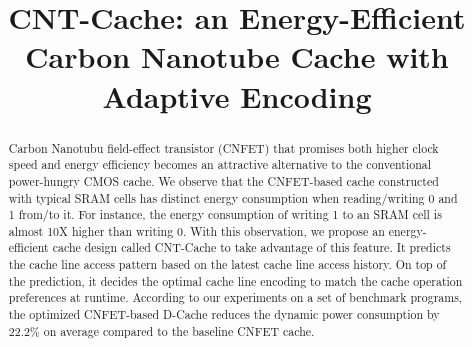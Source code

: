 \documentclass[conference]{IEEEtran}
\begin{document}
%
\title{CNT-Cache: an Energy-Efficient Carbon Nanotube Cache with Adaptive Encoding}

\maketitle

\begin{abstract}
    Carbon Nanotubu field-effect transistor (CNFET) that 
    promises both higher clock speed and energy efficiency 
    becomes an attractive alternative to the conventional 
    power-hungry CMOS cache. We observe that the CNFET-based cache 
    constructed with typical SRAM cells has distinct energy consumption 
    when reading/writing 0 and 1 from/to it. For instance, the energy consumption 
    of writing 1 to an SRAM cell is almost 10X higher than writing 0. 
    With this observation, we propose an energy-efficient cache design 
    called CNT-Cache to take advantage of this feature. It predicts the cache 
    line access pattern based on the latest cache line access history.  
    On top of the prediction, it decides the optimal cache line encoding 
    to match the cache operation preferences at runtime. According to 
    our experiments on a set of benchmark programs, the optimized CNFET-based 
    D-Cache reduces the dynamic power consumption by 22.2\% on average 
    compared to the baseline CNFET cache.
\end{abstract}

%
\IEEEpeerreviewmaketitle
\end{document}
